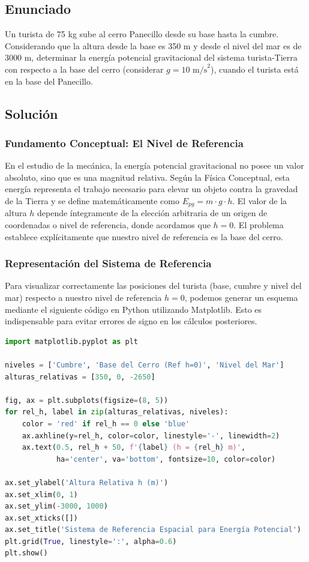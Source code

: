 \documentclass[12pt,a4paper]{article}
\begin{document}
\newpage
\subsection*{Enunciado}
Un turista de 75 kg sube al cerro Panecillo desde su base hasta la cumbre. Considerando que la altura desde la base es 350 m y desde el nivel del mar es de 3000 m, determinar la energía potencial gravitacional del sistema turista-Tierra con respecto a la base del cerro (considerar $g = 10 \text{ m/s}^2$), cuando el turista está en la base del Panecillo.

\subsection*{Solución}

\subsubsection*{Fundamento Conceptual: El Nivel de Referencia}
En el estudio de la mecánica, la energía potencial gravitacional no posee un valor absoluto, sino que es una magnitud relativa. Según la Física Conceptual, esta energía representa el trabajo necesario para elevar un objeto contra la gravedad de la Tierra y se define matemáticamente como $E_{pg} = m \cdot g \cdot h$. El valor de la altura $h$ depende íntegramente de la elección arbitraria de un origen de coordenadas o nivel de referencia, donde acordamos que $h = 0$. El problema establece explícitamente que nuestro nivel de referencia es la base del cerro.

\subsubsection*{Representación del Sistema de Referencia}
Para visualizar correctamente las posiciones del turista (base, cumbre y nivel del mar) respecto a nuestro nivel de referencia $h=0$, podemos generar un esquema mediante el siguiente código en Python utilizando Matplotlib. Esto es indispensable para evitar errores de signo en los cálculos posteriores.

\begin{lstlisting}[language=Python]
import matplotlib.pyplot as plt

niveles = ['Cumbre', 'Base del Cerro (Ref h=0)', 'Nivel del Mar']
alturas_relativas = [350, 0, -2650]

fig, ax = plt.subplots(figsize=(8, 5))
for rel_h, label in zip(alturas_relativas, niveles):
    color = 'red' if rel_h == 0 else 'blue'
    ax.axhline(y=rel_h, color=color, linestyle='-', linewidth=2)
    ax.text(0.5, rel_h + 50, f'{label} (h = {rel_h} m)', 
            ha='center', va='bottom', fontsize=10, color=color)

ax.set_ylabel('Altura Relativa h (m)')
ax.set_xlim(0, 1)
ax.set_ylim(-3000, 1000)
ax.set_xticks([])
ax.set_title('Sistema de Referencia Espacial para Energía Potencial')
plt.grid(True, linestyle=':', alpha=0.6)
plt.show()
\end{lstlisting}
\end{document}
